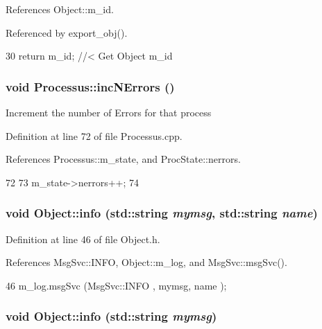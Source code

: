 References Object::m\_\-id.

Referenced by export\_\-obj().


\begin{DoxyCode}
30 { return m_id;         } //< Get Object m_id 
\end{DoxyCode}
\hypertarget{classProcessus_abe603d0636f76db6aa6c5c60cf34c591}{
\subsubsection[{incNErrors}]{\setlength{\rightskip}{0pt plus 5cm}void Processus::incNErrors ()}}
\label{classProcessus_abe603d0636f76db6aa6c5c60cf34c591}
Increment the number of Errors for that process 

Definition at line 72 of file Processus.cpp.

References Processus::m\_\-state, and ProcState::nerrors.


\begin{DoxyCode}
72                            {
73   m_state->nerrors++;
74 }
\end{DoxyCode}
\hypertarget{classObject_a1ca123253dfd30fc28b156f521dcbdae}{
\subsubsection[{info}]{\setlength{\rightskip}{0pt plus 5cm}void Object::info (std::string {\em mymsg}, \/  std::string {\em name})}}
\label{classObject_a1ca123253dfd30fc28b156f521dcbdae}


Definition at line 46 of file Object.h.

References MsgSvc::INFO, Object::m\_\-log, and MsgSvc::msgSvc().


\begin{DoxyCode}
46 { m_log.msgSvc (MsgSvc::INFO    , mymsg, name ); }
\end{DoxyCode}
\hypertarget{classObject_a644fd329ea4cb85f54fa6846484b84a8}{
\subsubsection[{info}]{\setlength{\rightskip}{0pt plus 5cm}void Object::info (std::string {\em mymsg})}}
\label{classObject_a644fd329ea4cb85f54fa6846484b84a8}


